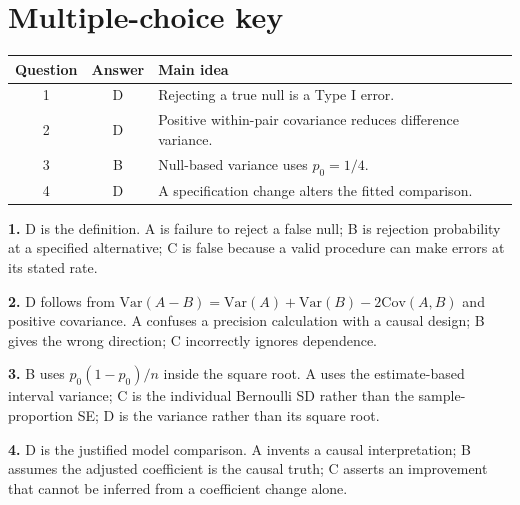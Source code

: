 \documentclass[11pt]{article}
\begin{document}
\section*{Multiple-choice key}
\begin{tabular}{ccl}
\toprule Question & Answer & Main idea\\\midrule
1 & D & Rejecting a true null is a Type I error.\\
2 & D & Positive within-pair covariance reduces difference variance.\\
3 & B & Null-based variance uses $p_0=1/4$.\\
4 & D & A specification change alters the fitted comparison.\\\bottomrule
\end{tabular}

\textbf{1.} D is the definition. A is failure to reject a false null; B is rejection probability at a specified alternative; C is false because a valid procedure can make errors at its stated rate.

\textbf{2.} D follows from $\mathrm{Var}(A-B)=\mathrm{Var}(A)+\mathrm{Var}(B)-2\mathrm{Cov}(A,B)$ and positive covariance. A confuses a precision calculation with a causal design; B gives the wrong direction; C incorrectly ignores dependence.

\textbf{3.} B uses $p_0(1-p_0)/n$ inside the square root. A uses the estimate-based interval variance; C is the individual Bernoulli SD rather than the sample-proportion SE; D is the variance rather than its square root.

\textbf{4.} D is the justified model comparison. A invents a causal interpretation; B assumes the adjusted coefficient is the causal truth; C asserts an improvement that cannot be inferred from a coefficient change alone.
\end{document}
